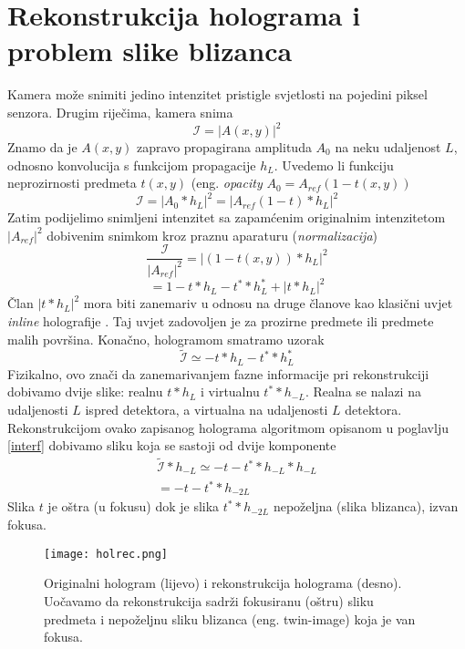 \documentclass[hidelinks]{ferseminar}
\begin{document}
\section{Rekonstrukcija holograma i problem slike blizanca}
\label{reconstruction}
Kamera može snimiti jedino intenzitet pristigle svjetlosti na pojedini piksel senzora. Drugim riječima, kamera snima
\begin{equation}
\mathcal{I}=|A(x,y)|^2
\end{equation} 
Znamo da je $A(x,y)$ zapravo propagirana amplituda $A_0$ na neku udaljenost $L$, odnosno konvolucija s funkcijom propagacije $h_L$. Uvedemo li funkciju neprozirnosti predmeta $t(x,y)$ (eng. \emph{opacity} $A_0 = A_{ref}(1 - t(x,y))$
\begin{equation}
\mathcal{I}=|A_0*h_L|^2
=|A_{ref}(1-t)*h_L|^2
\end{equation}
Zatim podijelimo snimljeni intenzitet sa zapamćenim originalnim intenzitetom $|A_{ref}|^2$ dobivenim snimkom kroz praznu aparaturu (\emph{normalizacija})
\begin{equation}
\frac{\mathcal{I}}{|A_{ref}|^2}=|(1-t(x,y))*h_L|^2
\end{equation}
\begin{equation}
=1-t*h_L-t^**h_L^*+|t*h_L|^2
\end{equation}
Član $|t*h_L|^2$ mora biti zanemariv u odnosu na druge članove kao klasični uvjet \emph{inline} holografije \cite{denis2005twin}. Taj uvjet zadovoljen je za prozirne predmete ili predmete malih površina. Konačno, hologramom smatramo uzorak
\begin{equation}
\mathcal{\tilde{I}}\simeq-t*h_L-t^**h_L^*
\end{equation}
Fizikalno, ovo znači da zanemarivanjem fazne informacije pri rekonstrukciji dobivamo dvije slike: realnu $t*h_L$ i virtualnu $t^**h_{-L}$. Realna se nalazi na udaljenosti $L$ ispred detektora, a virtualna na udaljenosti $L$ \grqq detektora.\\
Rekonstrukcijom ovako zapisanog holograma algoritmom opisanom u poglavlju \ref{interf} dobivamo sliku koja se sastoji od dvije komponente
\begin{gather}
\mathcal{\tilde{I}}*h_{-L}\simeq-t-t^**h_{-L}*h_{-L}\\
=-t-t^**h_{-2L}
\end{gather}
Slika $t$ je oštra (u fokusu) dok je slika $t^**h_{-2L}$ nepoželjna (slika blizanca), izvan fokusa.

\begin{figure}[h]
	\texttt{[image: holrec.png]}
	\caption{Originalni hologram (lijevo) i rekonstrukcija holograma (desno). Uočavamo da rekonstrukcija sadrži fokusiranu (oštru) sliku predmeta i nepoželjnu sliku blizanca (eng. twin-image) koja je van fokusa.}
	\label{simulation}
\end{figure}
\end{document}
